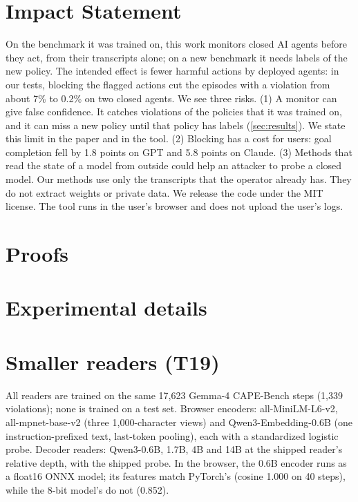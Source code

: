 \documentclass{article}
\begin{document}
\section*{Impact Statement}
On the benchmark it was trained on, this work monitors closed AI agents before they act, from their transcripts alone; on a new benchmark it needs labels of the new policy. The intended effect is fewer harmful actions by deployed agents: in our tests, blocking the flagged actions cut the episodes with a violation from about 7\% to 0.2\% on two closed agents. We see three risks.
(1) A monitor can give false confidence. It catches violations of the policies that it was trained on, and it can miss a new policy until that policy has labels (\cref{sec:results}). We state this limit in the paper and in the tool.
(2) Blocking has a cost for users: goal completion fell by 1.8 points on GPT and 5.8 points on Claude.
(3) Methods that read the state of a model from outside could help an attacker to probe a closed model. Our methods use only the transcripts that the operator already has. They do not extract weights or private data.
We release the code under the MIT license. The tool runs in the user's browser and does not upload the user's logs.

\FloatBarrier



\newpage
\appendix
\onecolumn
\section{Proofs}
\label{app:proofs}


\section{Experimental details}
\label{app:details}


\section{Smaller readers (T19)}
\label{app:small}
All readers are trained on the same 17{,}623 Gemma-4 CAPE-Bench steps (1{,}339 violations); none is trained on a test set. Browser encoders: all-MiniLM-L6-v2, all-mpnet-base-v2 (three 1{,}000-character views) and Qwen3-Embedding-0.6B (one instruction-prefixed text, last-token pooling), each with a standardized logistic probe. Decoder readers: Qwen3-0.6B, 1.7B, 4B and 14B at the shipped reader's relative depth, with the shipped probe. In the browser, the 0.6B encoder runs as a float16 ONNX model; its features match PyTorch's (cosine 1.000 on 40 steps), while the 8-bit model's do not (0.852).
\end{document}
